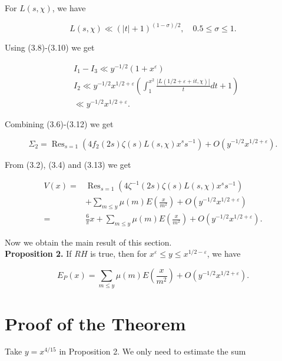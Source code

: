 \documentclass[10pt]{article}
\begin{document}
For $L(s, \chi)$, we have


\begin{equation*}
L(s, \chi) \ll(|t|+1)^{(1-\sigma) / 2}, \quad 0.5 \leq \sigma \leq 1 . \tag{3.10}
\end{equation*}


Using (3.8)-(3.10) we get


\begin{align*}
& I_{1}-I_{3} \ll y^{-1 / 2}\left(1+x^{\varepsilon}\right)  \tag{3.11}\\
& I_{2} \ll y^{-1 / 2} x^{1 / 2+\varepsilon}\left(\int_{1}^{x^{2}} \frac{|L(1 / 2+\varepsilon+i t, \chi)|}{t} d t+1\right)  \tag{3.12}\\
& \ll y^{-1 / 2} x^{1 / 2+\varepsilon}.
\end{align*}


Combining (3.6)-(3.12) we get


\begin{equation*}
\Sigma_{2}=\operatorname{Res}_{s=1}\left(4 f_{2}(2 s) \zeta(s) L(s, \chi) x^{s} s^{-1}\right)+O\left(y^{-1 / 2} x^{1 / 2+\varepsilon}\right) . \tag{3.13}
\end{equation*}


From (3.2), (3.4) and (3.13) we get


\begin{align*}
V(x)= & \operatorname{Res}_{s=1}\left(4 \zeta^{-1}(2 s) \zeta(s) L(s, \chi) x^{s} s^{-1}\right)  \tag{3.14}\\
& +\sum_{m \leq y} \mu(m) E\left(\frac{x}{m^{2}}\right)+O\left(y^{-1 / 2} x^{1 / 2+\varepsilon}\right) \\
= & \frac{6}{\pi} x+\sum_{m \leq y} \mu(m) E\left(\frac{x}{m^{2}}\right)+O\left(y^{-1 / 2} x^{1 / 2+\varepsilon}\right).
\end{align*}


Now we obtain the main result of this section.\\
\medskip\noindent\textbf{Proposition 2.} If $RH$ is true, then for $x^{\varepsilon} \leq y \leq x^{1 / 2-\varepsilon}$, we have


\begin{equation*}
E_{P}(x)=\sum_{m \leq y} \mu(m) E\left(\frac{x}{m^{2}}\right)+O\left(y^{-1 / 2} x^{1 / 2+\varepsilon}\right) . \tag{3.15}
\end{equation*}


\section{Proof of the Theorem}
Take $y=x^{4/15}$ in Proposition 2. We only need to estimate the sum
\end{document}
